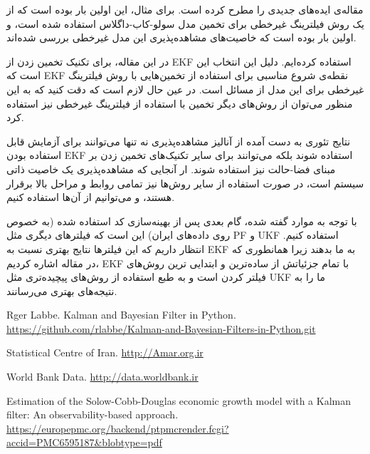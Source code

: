 \documentclass[11pt, fleqn]{article}
\begin{document}
\begin{multicols}{2}


مقاله‌ی
\cite{main}
 ایده‌های جدیدی را مطرح کرده است. برای مثال، این اولین بار بوده است که از یک روش فیلترینگ غیرخطی برای تخمین مدل سولو-کاب-داگلاس استفاده شده است، و اولین بار بوده است که خاصیت‌های مشاهده‌پذیری این مدل غیرخطی بررسی شده‌اند. 

در این مقاله، برای تکنیک تخمین زدن از EKF استفاده کرده‌ایم. دلیل این انتخاب این است که EKF نقطه‌ی شروع مناسبی برای استفاده از تخمین‌هایی با روش فیلترینگ غیرخطی برای این مدل از مسائل است. در عین حال لازم است که دقت کنید که به این منظور می‌توان از روش‌های دیگر تخمین‌ با استفاده از فیلترینگ غیرخطی نیز استفاده کرد.

نتایج تئوری به دست آمده از آنالیز مشاهده‌پذیری نه تنها می‌توانند برای آزمایش قابل استفاده بودن EKF استفاده شوند بلکه می‌توانند برای سایر تکنیک‌های تخمین زدن بر مبنای فضا-حالت
نیز استفاده شوند. ار آنجایی که مشاهده‌پذیری یک خاصیت ذاتی سیستم است، در صورت استفاده از سایر روش‌ها نیز تمامی روابط و مراحل بالا برقرار هستند، و می‌توانیم از آن‌ها استفاده کنیم.

با توجه به موارد گفته شده، گام بعدی پس از بهینه‌سازی کد استفاده شده (به خصوص روی داده‌های ایران) این است که فیلتر‌های دیگری مثل
PF
و
UKF
استفاده کنیم. انتظار داریم که این فیلترها نتایج بهتری نسبت به
EKF
به ما بدهند زیرا همانطوری که در مقاله اشاره کردیم، 
EKF
با تمام جزئیاتش از ساده‌ترین و ابتدایی ترین روش‌های فیلتر کردن است و به طبع استفاده از روش‌های پیچیده‌تری مثل UKF ما را به نتیجه‌های بهتری می‌رسانند.

\end{multicols}






















\newhline
\begin{LTR}
\begin{thebibliography}{99}

Rger Labbe. Kalman and Bayesian Filter in Python. \url{https://github.com/rlabbe/Kalman-and-Bayesian-Filters-in-Python.git}

  Statistical Centre of Iran. \url{http://Amar.org.ir}

World Bank Data. \url{http://data.worldbank.ir}

Estimation of the Solow-Cobb-Douglas economic growth model with a
Kalman filter: An observability-based approach. \url{https://europepmc.org/backend/ptpmcrender.fcgi?accid=PMC6595187&blobtype=pdf}
\end{thebibliography}
\end{LTR}
\end{document}
